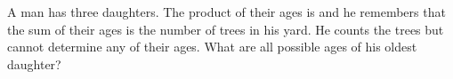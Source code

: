 A man has three daughters. The product of their ages is  and he remembers that the sum of their ages is the number of trees in his yard. He counts the trees but cannot determine any of their ages. What are all possible ages of his oldest daughter?